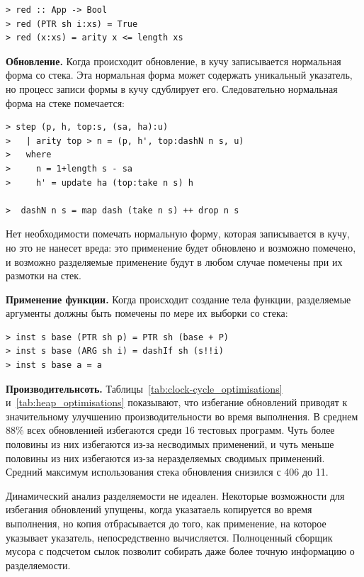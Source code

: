 \documentclass[flenqn, 14pt]{extarticle}
\begin{document}
\begin{verbatim}
> red :: App -> Bool
> red (PTR sh i:xs) = True
> red (x:xs) = arity x <= length xs
\end{verbatim} 

\textbf{Обновление.} Когда происходит обновление, в кучу записывается нормальная форма со стека. Эта нормальная форма может содержать уникальный указатель, но процесс записи формы в кучу сдублирует его. Следовательно нормальная форма на стеке помечается:
\begin{verbatim}
> step (p, h, top:s, (sa, ha):u)
>   | arity top > n = (p, h', top:dashN n s, u)
>   where
>     n = 1+length s - sa
>     h' = update ha (top:take n s) h

>  dashN n s = map dash (take n s) ++ drop n s
\end{verbatim}

Нет необходимости помечать нормальную форму, которая записывается в кучу, но это не нанесет вреда: это применение будет обновлено и возможно помечено, и возможно разделяемые применение будут в любом случае помечены при их размотки на стек. 

\textbf{Применение функции.} Когда происходит создание тела функции, разделяемые аргументы должны быть помечены по мере их выборки со стека:
\begin{verbatim}
> inst s base (PTR sh p) = PTR sh (base + P)
> inst s base (ARG sh i) = dashIf sh (s!!i)
> inst s base a = a
\end{verbatim}

\textbf{Производительнсоть.} Таблицы~\ref{tab:clock-cycle_optimisations} и~\ref{tab:heap_optimisations} показывают, что избегание обновлений приводят к значительному улучшению производительности во время выполнения. В среднем 88\% всех обновленией избегаются среди 16 тестовых программ. Чуть более половины из них избегаются из-за несводимых применений, и чуть меньше половины из них избегаются из-за неразделяемых сводимых применений. Средний максимум использования стека обновления снизился с 406 до 11.

Динамический анализ разделяемости не идеален. Некоторые возможности для избегания обновлений упущены, когда указатаель копируется во время выполнения, но копия отбрасывается до того, как применение, на которое указывает указатель, непосредственно вычисляется. Полноценный сборщик мусора с подсчетом сылок позволит собирать даже более точную информацию о разделяемости.
\end{document}
